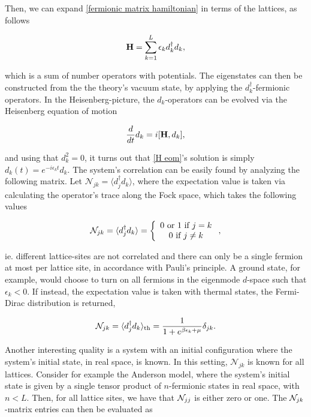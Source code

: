 \documentclass{homework}
\begin{document}
Then, we can expand \eqref{fermionic matrix hamiltonian} in terms of the lattices, as follows 

\begin{equation}
    {\bf H} = \sum_{k = 1}^{L} \epsilon_k d_k^\dagger d_k,
\end{equation}

which is a sum of number operators with potentials. The eigenstates can then be constructed from the the theory's vacuum state, by applying the $d_k^{\dagger}$-fermionic operators. In the Heisenberg-picture, the $d_k$-operators can be evolved via the Heisenberg equation of motion

\begin{equation}
\frac{d}{dt} d_k = i [{\bf H}, d_k],
\label{H eom}
\end{equation}

and using that $d_k^2 = 0$, it turns out that \eqref{H eom}'s solution is simply $d_k(t) = e^{-i\epsilon_k t} d_k$. The system's correlation can be easily found by analyzing the following matrix. Let $\mathcal{N}_{jk} = \langle d_j^\dagger d_k \rangle$, where the expectation value is taken via calculating the operator's trace along the Fock space, which takes the following values 

\begin{equation}
    \mathcal{N}_{jk} = \langle d_j^\dagger d_k \rangle = \left\{\begin{array}{c}
        0 \textnormal{ or } 1 \textnormal{ if } j=k  \\
        0 \textnormal{ if } j \neq k 
    \end{array} \right.,
\end{equation}

ie. different lattice-sites are not correlated and there can only be a single fermion at most per lattice site, in accordance with Pauli's principle. A ground state, for example, would choose to turn on all fermions in the eigenmode $d$-space such that $\epsilon_k < 0$. If instead, the expectation value is taken with thermal states, the Fermi-Dirac distribution is returned, 

\begin{equation}
    \mathcal{N}_{jk} = \langle d_j^\dagger d_k \rangle_{\textnormal{th}} =  \frac{1}{1+e^{\beta \epsilon_k + \mu}} \delta_{jk}.
\end{equation}

Another interesting quality is a system with an initial configuration where the system's initial state, in real space, is known. In this setting, $\mathcal{N}_{jk}$ is known for all lattices. Consider for example the Anderson model, where the system's initial state is given by a single tensor product of $n$-fermionic states in real space, with $n<L$. Then, for all lattice sites, we have that $\mathcal{N}_{jj}$ is either zero or one. The $\mathcal{N}_{jk}$-matrix entries can then be evaluated as 
\end{document}
